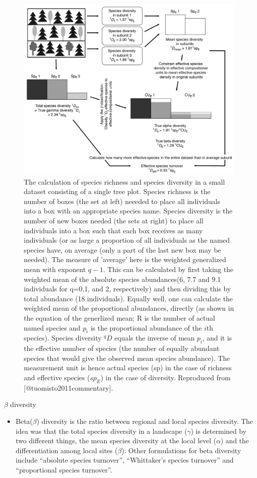 \documentclass[
  ignorenonframetext,
  aspectratio=169]{beamer}
\providecommand{\tightlist}{%
  \setlength{\itemsep}{0pt}\setlength{\parskip}{0pt}}
\begin{document}
\begin{frame}{}
\protect\hypertarget{section-11}{}
\begin{figure}
\includegraphics[width=0.32\linewidth]{../images/partitioning_of_species_diversity} \caption{The calculation of species richness and species diversity in a small dataset consisting of a single tree plot. Species richness is the number of boxes (the set at left) neeeded to place all individuals into a box with an appropriate species name. Species diversity is the number of new boxes needed (the sets at right) to place all individuals into a box such that each box receives as many individuals (or as large a proportion of all individuals as the named species have, on average (only a part of the last new box may be needed). The measure of 'average' here is the weighted generalized mean with exponent $q-1$. This can be calculated by first taking the weighted mean of the absolute species abundances(6, 7.7 and 9.1 individuals for q=0,1, and 2, respectively) and then dividing this by total abundance (18 individuals). Equally well, one can calculate the weighted mean of the proportional abundances, directly (as shown in the equation of the generlized mean; R is the number of actual named species and $p_i$ is the proportional abundance of the $i$th species). Species diversity ${}^q D$ equals the inverse of mean $p_i$, and it is the effective number of species (the number of equally abundant species that would give the observed mean species abundance). The measurement unit is hence actual species (sp) in the case of richness and effective species ($sp_E$) in the case of diversity. Reproduced from [@tuomisto2011commentary].}\label{fig:relation-alpha-beta-gamma}
\end{figure}
\end{frame}

\begin{frame}{\(\beta\) diversity}
\protect\hypertarget{beta-diversity}{}
\begin{itemize}
\tightlist
\item
  Beta(\(\beta\)) diversity is the ratio between regional and local
  species diversity. The idea was that the total species diversity in a
  landscape (\(\gamma\)) is determined by two different things, the mean
  species diversity at the local level (\(\alpha\)) and the
  differentiation among local sites (\(\beta\)). Other formulations for
  beta diversity include ``absolute species turnover'', ``Whittaker's
  species turnover'' and ``proportional species turnover''.
\end{itemize}
\end{frame}
\end{document}
